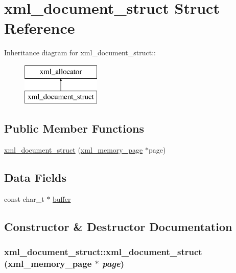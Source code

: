 \hypertarget{structxml__document__struct}{
\section{xml\_\-document\_\-struct Struct Reference}
\label{structxml__document__struct}
}
Inheritance diagram for xml\_\-document\_\-struct::\begin{figure}[H]
\begin{center}
\leavevmode
\includegraphics[height=2cm]{structxml__document__struct}
\end{center}
\end{figure}
\subsection*{Public Member Functions}
\begin{DoxyCompactItemize}
\item 
\hyperlink{structxml__document__struct_aea3482436c20abd98ca063c3bd5dcfba}{xml\_\-document\_\-struct} (\hyperlink{structxml__memory__page}{xml\_\-memory\_\-page} $\ast$page)
\end{DoxyCompactItemize}
\subsection*{Data Fields}
\begin{DoxyCompactItemize}
\item 
const char\_\-t $\ast$ \hyperlink{structxml__document__struct_a120451f29b8cc2a82a3ecc926449ea0e}{buffer}
\end{DoxyCompactItemize}


\subsection{Constructor \& Destructor Documentation}
\hypertarget{structxml__document__struct_aea3482436c20abd98ca063c3bd5dcfba}{
\subsubsection[{xml\_\-document\_\-struct}]{\setlength{\rightskip}{0pt plus 5cm}xml\_\-document\_\-struct::xml\_\-document\_\-struct ({\bf xml\_\-memory\_\-page} $\ast$ {\em page})}}
\label{structxml__document__struct_aea3482436c20abd98ca063c3bd5dcfba}


